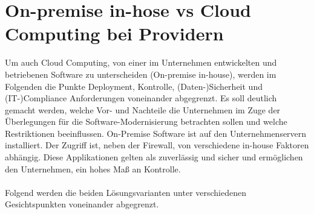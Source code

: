 \section{On-premise in-hose vs Cloud Computing bei Providern}
\label{VgmOnPremise}


Um auch Cloud Computing, von einer im Unternehmen entwickelten und betriebenen Software zu unterscheiden (On-premise in-house), werden im Folgenden die Punkte Deployment, Kontrolle, (Daten-)Sicherheit und (IT-)Compliance Anforderungen voneinander abgegrenzt. Es soll deutlich gemacht werden, welche Vor- und Nachteile die Unternehmen im Zuge der Überlegungen für die Software-Modernisierung betrachten sollen und welche Restriktionen  beeinflussen. On-Premise Software ist auf den Unternehmenservern installiert. Der Zugriff ist, neben der Firewall, von verschiedene in-house Faktoren abhängig. Diese Applikationen gelten als zuverlässig und sicher und ermöglichen den Unternehmen, ein hohes Maß an Kontrolle. \cite{fisher2018cloud}
\\\\
Folgend werden die beiden Lösungsvarianten unter verschiedenen Gesichtspunkten voneinander abgegrenzt.
